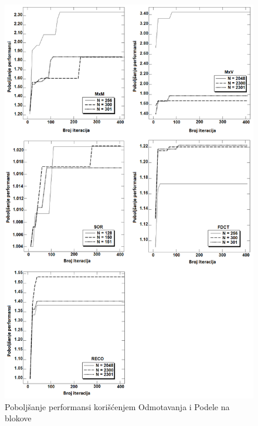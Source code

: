 \documentclass[a4paper]{article}
\begin{document}
{\begin{figure}[p]
\begin{center}
\includegraphics[width=\textwidth]{performanse1}
\end{center}
\caption{Poboljšanje performansi korišćenjem Odmotavanja i Podele na blokove}
\label{fig:slika1}
\end{figure}

}
\end{document}
